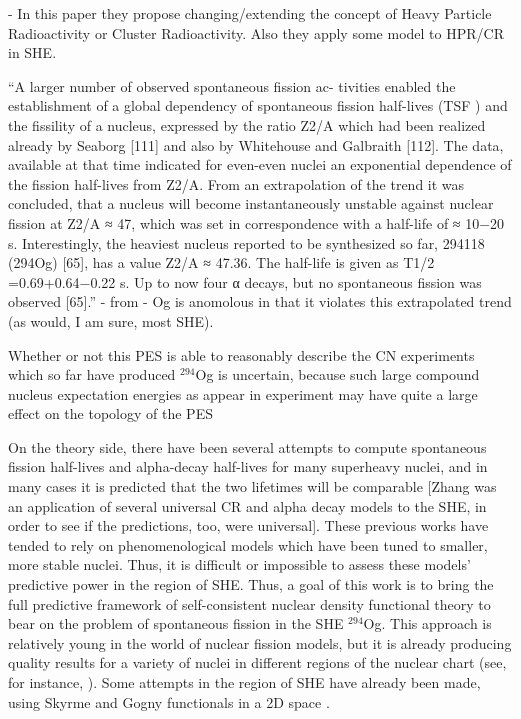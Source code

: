 \cite{Poenaru2011, Poenaru2012} - In this paper they propose changing/extending the concept of Heavy Particle Radioactivity or Cluster Radioactivity. Also they apply some model to HPR/CR in SHE.

``A larger number of observed spontaneous fission ac- tivities enabled the establishment of a global dependency of spontaneous fission half-lives (TSF ) and the fissility of a nucleus, expressed by the ratio Z2/A which had been realized already by Seaborg [111] and also by Whitehouse and Galbraith [112]. The data, available at that time indicated for even-even nuclei an exponential dependence of the fission half-lives from Z2/A. From an extrapolation of the trend it was concluded, that a nucleus will become instantaneously unstable against nuclear fission at Z2/A ≈ 47, which was set in correspondence with a half-life of ≈ 10−20 s. Interestingly, the heaviest nucleus reported to be synthesized so far, 294118 (294Og) [65], has a value Z2/A ≈ 47.36. The half-life is given as T1/2 =0.69+0.64−0.22 s. Up to now four α decays, but no spontaneous fission was observed [65].'' - from \cite{Heßberger2017} - Og is anomolous in that it violates this extrapolated trend (as would, I am sure, most SHE).

Whether or not this PES is able to reasonably describe the CN experiments which so far have produced $^{294}$Og is uncertain, because such large compound nucleus expectation energies as appear in experiment may have quite a large effect on the topology of the PES \cite{Pei2009}

On the theory side, there have been several attempts to compute spontaneous fission half-lives and alpha-decay half-lives for many superheavy nuclei, and in many cases it is predicted that the two lifetimes will be comparable \cite{Poenaru2011, Poenaru2012, Zhang2018} [Zhang was an application of several universal CR and alpha decay models to the SHE, in order to see if the predictions, too, were universal]. These previous works have tended to rely on phenomenological models which have been tuned to smaller, more stable nuclei. Thus, it is difficult or impossible to assess these models' predictive power in the region of SHE. Thus, a goal of this work is to bring the full predictive framework of self-consistent nuclear density functional theory to bear on the problem of spontaneous fission in the SHE $^{294}$Og. This approach is relatively young in the world of nuclear fission models, but it is already producing quality results for a variety of nuclei in different regions of the nuclear chart (see, for instance, \cite{Mcdonnell2014, Sadhukhan2017, Sadhukhan2016, Tsekhanovich2018}). Some attempts in the region of SHE have already been made, using Skyrme and Gogny functionals in a 2D space \cite{Reinhard2017, Giuliani2017, Warda2012, Baran2015}.


